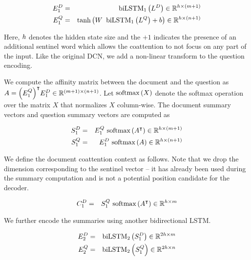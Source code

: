 \documentclass{article} %
\begin{document}
\begin{eqnarray}
\encoded_1^D &=& \bilstm_1 \left( \lookup^D \right) \in \real^{\dhid \times (\ddocument+1)}
\\
\encoded_1^Q &=& \text{tanh} \left( W~\hspace{2px}\bilstm_1 \left( \lookup^Q \right) + b \right) \in \real^{\dhid \times (\dquestion+1)}
\end{eqnarray}

Here, $h$ denotes the hidden state size and the $+1$ indicates the presence of an additional sentinel word which allows the coattention to not focus on any part of the input.
Like the original DCN, we add a non-linear transform to the question encoding.

We compute the affinity matrix between the document and the question as $A = 
{\left( E_1^Q \right)}^\intercal E_1^D \in \mathbb{R}^{(m+1) \times (n+1)}$.
Let ${\rm softmax}\left({X}\right)$ denote the softmax operation over the matrix $X$ that normalizes $X$ column-wise.
The document summary vectors and question summary vectors are computed as

\begin{eqnarray}
\label{eq:summary}
S_1^D &=& E_1^Q ~{\rm softmax}\left({A^\intercal}\right) \in \mathbb{R}^{h \times (m + 1)}
\\
S_1^Q &=& E_1^D ~{\rm softmax}\left({A}\right) \in \mathbb{R}^{h \times (n + 1)}
\end{eqnarray}

We define the document coattention context as follows.
Note that we drop the dimension corresponding to the sentinel vector -- it has already been used during the summary computation and is not a potential position candidate for the decoder.

\begin{eqnarray}
\label{eq:context}
C_1^D &=& S_1^Q ~{\rm softmax}\left({A^\intercal}\right) \in \mathbb{R}^{h \times m}
\end{eqnarray}

We further encode the summaries using another bidirectional LSTM.

\begin{eqnarray}
E_2^D &=& {\rm biLSTM}_2 \left( S_1^D \right) \in \mathbb{R}^{2 h \times m}
\\
E_2^Q &=& {\rm biLSTM}_2 \left( S_1^Q \right) \in \mathbb{R}^{2 h \times n}
\end{eqnarray}
\end{document}
